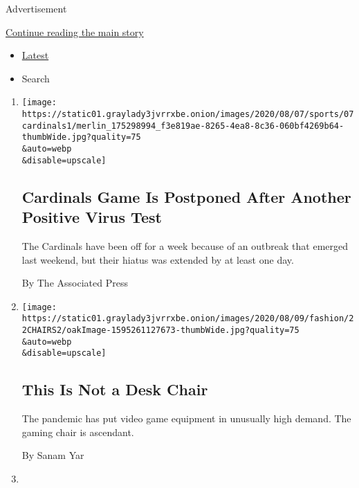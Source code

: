 Advertisement

\protect\hyperlink{after-mid1}{Continue reading the main story}

\begin{itemize}
\tightlist
\item
  \protect\hyperlink{stream-panel}{Latest}
\item
  Search
\end{itemize}

\begin{enumerate}
\def\labelenumi{\arabic{enumi}.}
\item
  \href{/2020/08/07/sports/baseball/cardinals-game-postponed-coronavirus.html}{}

  \texttt{[image: https://static01.graylady3jvrrxbe.onion/images/2020/08/07/sports/07cardinals1/merlin\_175298994\_f3e819ae-8265-4ea8-8c36-060bf4269b64-thumbWide.jpg?quality=75\\\&auto=webp\\\&disable=upscale]}

  \hypertarget{cardinals-game-is-postponed-after-another-positive-virus-test}{%
  \subsection{Cardinals Game Is Postponed After Another Positive Virus
  Test}\label{cardinals-game-is-postponed-after-another-positive-virus-test}}

  The Cardinals have been off for a week because of an outbreak that
  emerged last weekend, but their hiatus was extended by at least one
  day.

  By The Associated Press
\item
  \href{/2020/08/07/style/gamer-chair-market-herman-miller.html}{}

  \texttt{[image: https://static01.graylady3jvrrxbe.onion/images/2020/08/09/fashion/22CHAIRS2/oakImage-1595261127673-thumbWide.jpg?quality=75\\\&auto=webp\\\&disable=upscale]}

  \hypertarget{this-is-not-a-desk-chair}{%
  \subsection{This Is Not a Desk Chair}\label{this-is-not-a-desk-chair}}

  The pandemic has put video game equipment in unusually high demand.
  The gaming chair is ascendant.

  By Sanam Yar
\item
  \href{/2020/08/07/sports/autoracing/formula-1-season-coronavirus.html}{}


\end{enumerate}

